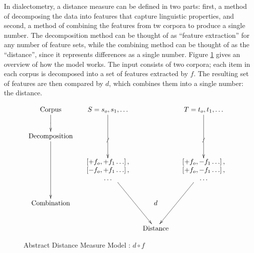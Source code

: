 In dialectometry, a distance measure can be defined in two parts:
first, a method of decomposing the data into features that capture
linguistic properties, and second, a method of combining the features
from tw corpora to produce a single number. The decomposition
method can be thought of as ``feature extraction'' for any number of
feature sets, while the combining method can be thought of as the
``distance'', since it represents differences as a single
number. Figure \ref{abstract-distance-measure-model} gives an overview
of how the model works. The input consists of two corpora; each item in
each corpus is decomposed into a set of features extracted by $f$. The
resulting set of features are then compared by $d$, which combines
them into a single number: the distance.

\begin{figure}
\[\xymatrix@C=1pc{
 \textrm{Corpus} \ar@{>}[d]|{} &
  S = s_o,s_1,\ldots
  \ar@{>}[dd]|{f}
  &&
  T = t_o,t_1,\ldots
  \ar@{>}[dd]|{f}
  \\
\textrm{Decomposition}\ar@{>}[dd] &&&\\
 &
 *{\begin{array}{c}
     \left[ + f_o, +f_1 \ldots \right], \\
     \left[ - f_o, +f_1 \ldots \right], \\
     \ldots \\ \end{array}}
 \ar@{>}[ddr]
 &&
 *{\begin{array}{c}
     \left[ + f_o, -f_1 \ldots \right], \\
     \left[ + f_o, -f_1 \ldots \right], \\
     \ldots \\ \end{array}}
 \ar@{>}[ddl]  \\
 \textrm{Combination} && d & \\
 & & \textrm{Distance} & \\
} \]
\label{abstract-distance-measure-model}
\caption{Abstract Distance Measure Model : $d \circ f$}
\end{figure}

